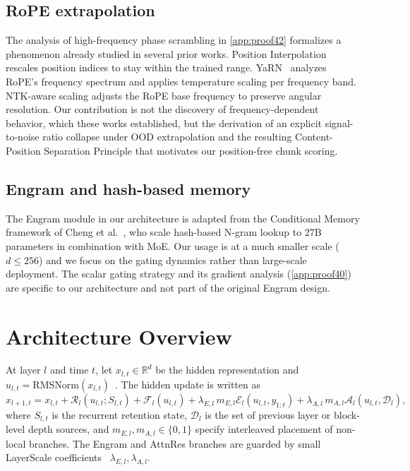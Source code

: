 \documentclass[preprint,12pt]{elsarticle}
\newcommand{\Ret}{\mathcal{R}}
\newcommand{\Eng}{\mathcal{E}}
\newcommand{\Att}{\mathcal{A}}
\newcommand{\FFN}{\mathcal{F}}
\newcommand{\RMS}{\mathrm{RMSNorm}}
\begin{document}
\subsection{RoPE extrapolation}

The analysis of high-frequency phase scrambling in \ref{app:proof42} formalizes a phenomenon already studied in several prior works. Position Interpolation~\cite{pi} rescales position indices to stay within the trained range. YaRN~\cite{yarn} analyzes RoPE's frequency spectrum and applies temperature scaling per frequency band. NTK-aware scaling adjusts the RoPE base frequency to preserve angular resolution. Our contribution is not the discovery of frequency-dependent behavior, which these works established, but the derivation of an explicit signal-to-noise ratio collapse under OOD extrapolation and the resulting Content-Position Separation Principle that motivates our position-free chunk scoring.

\subsection{Engram and hash-based memory}

The Engram module in our architecture is adapted from the Conditional Memory framework of Cheng et al.~\cite{engram}, who scale hash-based N-gram lookup to 27B parameters in combination with MoE. Our usage is at a much smaller scale ($d \leq 256$) and we focus on the gating dynamics rather than large-scale deployment. The scalar gating strategy and its gradient analysis (\ref{app:proof40}) are specific to our architecture and not part of the original Engram design.

\section{Architecture Overview}

At layer $l$ and time $t$, let $x_{l,t}\in\mathbb{R}^d$ be the hidden representation and $u_{l,t}=\RMS(x_{l,t})$~\cite{rmsnorm}. The hidden update is written as
\begin{equation}
\label{eq:hidden-update}
x_{l+1,t}
= x_{l,t}
+ \Ret_l(u_{l,t}; S_{l,t})
+ \FFN_l(u_{l,t})
+ \lambda_{E,l}\,m_{E,l}\Eng_l(u_{l,t}, y_{1:t})
+ \lambda_{A,l}\,m_{A,l}\Att_l(u_{l,t}, \mathcal{D}_l),
\end{equation}
where $S_{l,t}$ is the recurrent retention state, $\mathcal{D}_l$ is the set of previous layer or block-level depth sources, and $m_{E,l},m_{A,l}\in\{0,1\}$ specify interleaved placement of non-local branches. The Engram and AttnRes branches are guarded by small LayerScale coefficients~\cite{layerscale} $\lambda_{E,l},\lambda_{A,l}$.
\end{document}
